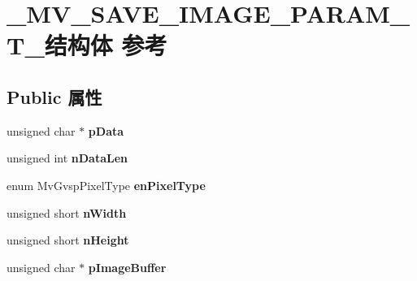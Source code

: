 \hypertarget{struct___m_v___s_a_v_e___i_m_a_g_e___p_a_r_a_m___t__}{}\section{\+\_\+\+M\+V\+\_\+\+S\+A\+V\+E\+\_\+\+I\+M\+A\+G\+E\+\_\+\+P\+A\+R\+A\+M\+\_\+\+T\+\_\+结构体 参考}
\label{struct___m_v___s_a_v_e___i_m_a_g_e___p_a_r_a_m___t__}
\subsection*{Public 属性}
\begin{DoxyCompactItemize}
\item 
\mbox{\label{struct___m_v___s_a_v_e___i_m_a_g_e___p_a_r_a_m___t___a9ac87bdfc7cf133fbd9cefe6803a8084}} 
unsigned char $\ast$ {\bfseries p\+Data}
\item 
\mbox{\label{struct___m_v___s_a_v_e___i_m_a_g_e___p_a_r_a_m___t___aef2eea9f854f62433ebb3c5fe16fdbf5}} 
unsigned int {\bfseries n\+Data\+Len}
\item 
\mbox{\label{struct___m_v___s_a_v_e___i_m_a_g_e___p_a_r_a_m___t___a4fb0063be95c22b0f3748d0d1a3726d1}} 
enum Mv\+Gvsp\+Pixel\+Type {\bfseries en\+Pixel\+Type}
\item 
\mbox{\label{struct___m_v___s_a_v_e___i_m_a_g_e___p_a_r_a_m___t___a9f26c566f89b2583d91982779c4b0955}} 
unsigned short {\bfseries n\+Width}
\item 
\mbox{\label{struct___m_v___s_a_v_e___i_m_a_g_e___p_a_r_a_m___t___a5b28e6af7c7b3d20c78a43da8e839936}} 
unsigned short {\bfseries n\+Height}
\item 
\mbox{\label{struct___m_v___s_a_v_e___i_m_a_g_e___p_a_r_a_m___t___aeade968646b962320e0f03926ca6dbf8}} 
unsigned char $\ast$ {\bfseries p\+Image\+Buffer}
\item 

\end{DoxyCompactItemize}
